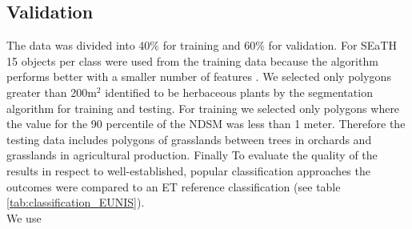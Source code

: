 \documentclass[authoryear, review,12pt,number]{elsarticle}
\begin{document}
\subsection{Validation} 
\label{subsec:Validation}
The data was divided into 40\% for training and 60\% for validation. For SEaTH 
15 objects per class were used from the training data because the algorithm 
performs better with a smaller number of features \citep{Nussbaum2006}. We 
selected only polygons greater than 200m$^{2}$ identified to be herbaceous 
plants by the segmentation algorithm for training and testing. For training we 
selected only polygons where the value for the 90 percentile of the NDSM was 
less than 1 meter. Therefore the testing data includes polygons of grasslands 
between trees in orchards and grasslands in agricultural production. Finally To 
evaluate the quality of the results in respect to well-established, popular 
classification approaches the outcomes were compared to an ET reference 
classification (see table \ref{tab:classification_EUNIS}).
\\
We use 
\end{document}
